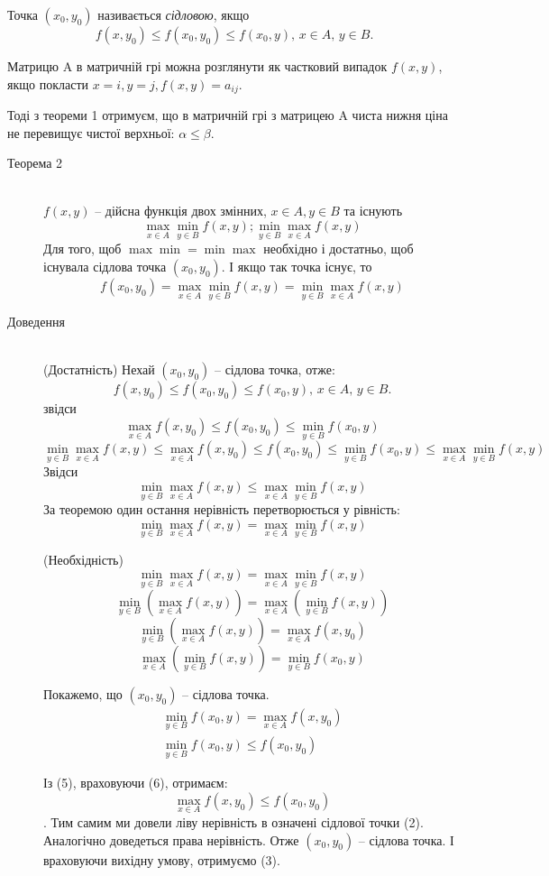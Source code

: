 \documentclass[12pt,a4paper]{article}
\begin{document}
Точка $(x_0, y_0)$ називається \emph{сідловою}, якщо
\begin{equation}
f(x, y_0) \le f(x_0, y_0) \le f(x_0, y),\, x \in A,\, y \in B.
\end{equation}

Матрицю A в матричній грі можна розглянути як частковий випадок $f(x, y)$, якщо покласти $x=i, y=j, f(x, y) = a_{ij}$.

Тоді з теореми 1 отримуєм, що в матричній грі з матрицею A чиста нижня ціна не перевищує чистої верхньої: $\alpha \le \beta$.

\begin{description}

\item[Теорема 2] \hfill \\
$f(x, y)$ -- дійсна функція двох змінних, $x \in A, y \in B$ та існують
\[
\max_{x \in A} \min_{y \in B}f(x, y); \min_{y \in B} \max_{x \in A}f(x, y)
\]
Для того, щоб $\max\min = \min\max$ необхідно і достатньо, щоб існувала сідлова точка $(x_0, y_0)$. І якщо так точка існує, то
\begin{equation}
f(x_0, y_0)=\max_{x \in A} \min_{y \in B}f(x, y) = \min_{y \in B} \max_{x \in A}f(x, y)
\end{equation}

\item[Доведення] \hfill \\
(Достатність) Нехай $(x_0, y_0)$ -- сідлова точка, отже:
\[
f(x, y_0) \le f(x_0, y_0) \le f(x_0, y),\, x \in A,\, y \in B.
\]
звідси
\begin{equation}
\max_{x \in A} f(x, y_0) \le f(x_0, y_0) \le \min_{y \in B} f(x_0, y)
\end{equation}
\[
\min_{y \in B} \max_{x \in A} f(x, y) \le \max_{x \in A} f(x, y_0) \le f(x_0, y_0) \le \min_{y \in B} f(x_0, y) \le \max_{x \in A}  \min_{y \in B} f(x, y)
\]
Звідси
\[
\min_{y \in B} \max_{x \in A} f(x, y)  \le \max_{x \in A}  \min_{y \in B} f(x, y)
\]
За теоремою один остання нерівність перетворюється у рівність:
\[
\min_{y \in B} \max_{x \in A} f(x, y)  = \max_{x \in A}  \min_{y \in B} f(x, y)
\]

(Необхідність) 
\[\min_{y \in B} \max_{x \in A} f(x, y)  = \max_{x \in A}  \min_{y \in B} f(x, y)\]
\[\min_{y \in B} \left(\max_{x \in A} f(x, y)\right)  = \max_{x \in A}  \left(\min_{y \in B} f(x, y)\right)\]
\[\min_{y \in B} \left(\max_{x \in A} f(x, y)\right)  = \max_{x \in A} f(x, y_0)\]
\[\max_{x \in A} \left(\min_{y \in B} f(x, y)\right)= \min_{y \in B} f(x_0, y)\]

Покажемо, що $(x_0, y_0)$ -- сідлова точка.
\begin{eqnarray}
\min_{y \in B} f(x_0, y)=\max_{x \in A} f(x, y_0)\\
\min_{y \in B} f(x_0, y) \le f(x_0, y_0)
\end{eqnarray}

Із (5), враховуючи (6), отримаєм:
\[\max_{x \in A} f(x, y_0) \le f(x_0, y_0) \]. Тим самим ми довели ліву нерівність в означені сідлової точки (2). Аналогічно доведеться права нерівність. Отже $(x_0, y_0)$ -- сідлова точка. І враховуючи вихідну умову, отримуємо (3).

\end{description}
\end{document}
